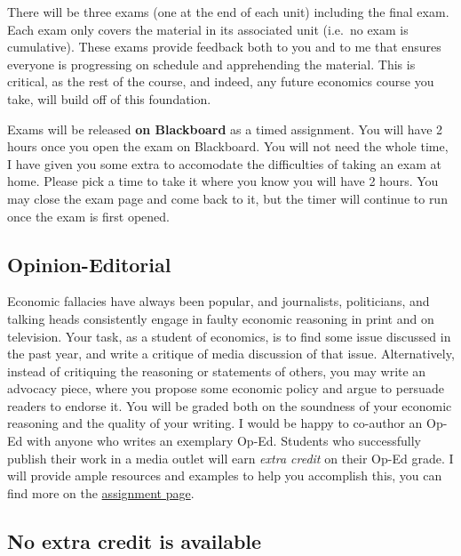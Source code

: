 \documentclass{article}
\begin{document}
There will be three exams (one at the end of each unit) including the
final exam. Each exam only covers the material in its associated unit
(i.e.~no exam is cumulative). These exams provide feedback both to you
and to me that ensures everyone is progressing on schedule and
apprehending the material. This is critical, as the rest of the course,
and indeed, any future economics course you take, will build off of this
foundation.

Exams will be released \textbf{on Blackboard} as a timed assignment. You
will have 2 hours once you open the exam on Blackboard. You will not
need the whole time, I have given you some extra to accomodate the
difficulties of taking an exam at home. Please pick a time to take it
where you know you will have 2 hours. You may close the exam page and
come back to it, but the timer will continue to run once the exam is
first opened.

\hypertarget{opinion-editorial}{%
\subsection*{Opinion-Editorial}\label{opinion-editorial}}

Economic fallacies have always been popular, and journalists,
politicians, and talking heads consistently engage in faulty economic
reasoning in print and on television. Your task, as a student of
economics, is to find some issue discussed in the past year, and write a
critique of media discussion of that issue. Alternatively, instead of
critiquing the reasoning or statements of others, you may write an
advocacy piece, where you propose some economic policy and argue to
persuade readers to endorse it. You will be graded both on the soundness
of your economic reasoning and the quality of your writing. I would be
happy to co-author an Op-Ed with anyone who writes an exemplary Op-Ed.
Students who successfully publish their work in a media outlet will earn
\emph{extra credit} on their Op-Ed grade. I will provide ample resources
and examples to help you accomplish this, you can find more on the
\href{}{assignment page}.

\hypertarget{no-extra-credit-is-available}{%
\subsection*{No extra credit is
available}\label{no-extra-credit-is-available}}
\end{document}
